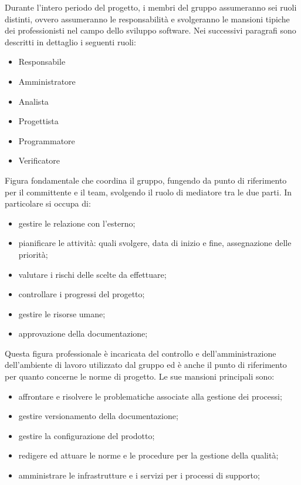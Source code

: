 Durante l’intero periodo del progetto, i membri del gruppo assumeranno sei ruoli distinti, ovvero assumeranno le responsabilità e svolgeranno le mansioni tipiche dei professionisti nel campo dello sviluppo software.
Nei successivi paragrafi sono descritti in dettaglio i seguenti ruoli:
\begin{itemize}
	\item Responsabile
	\item Amministratore
	\item Analista
	\item Progettista
	\item Programmatore
	\item Verificatore
\end{itemize}
Figura fondamentale che coordina il gruppo, fungendo da punto di riferimento per il committente e il team, svolgendo il ruolo di mediatore tra le due parti.
In particolare si occupa di:
\begin{itemize}
	\item gestire le relazione con l'esterno;
	\item pianificare le attività: quali svolgere, data di inizio e fine, assegnazione delle priorità;
	\item valutare i rischi delle scelte da effettuare;
	\item controllare i progressi del progetto;
	\item gestire le risorse umane;
	\item approvazione della documentazione;
\end{itemize}
Questa figura professionale è incaricata del controllo e dell’amministrazione dell’ambiente di lavoro utilizzato dal gruppo ed è anche il punto di riferimento per quanto concerne le norme di progetto. Le sue mansioni principali sono:
\begin{itemize}
	\item affrontare e risolvere le problematiche associate alla gestione dei processi;
	\item gestire versionamento della documentazione;
	\item gestire la configurazione del prodotto;
	\item redigere ed attuare le norme e le procedure per la gestione della qualità;
	\item amministrare le infrastrutture e i servizi per i processi di supporto;
\end{itemize}
